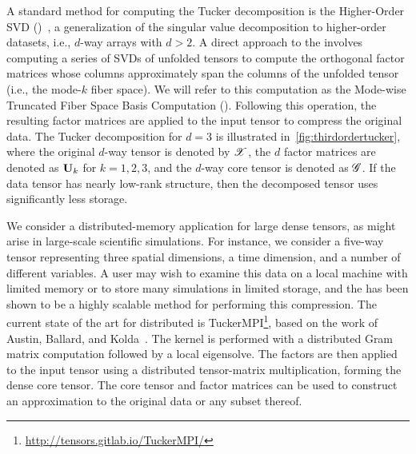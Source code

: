 A standard method for computing the Tucker decomposition is the Higher-Order SVD 
(\hosvd)~\cite{Lathauwer00amultilinear}, a generalization of the singular value 
decomposition to higher-order datasets, i.e., $d$-way arrays with $d>2$.
% 
A direct approach to the \hosvd involves computing a series of SVDs of 
unfolded tensors to compute the orthogonal factor matrices whose 
columns approximately span the columns of the unfolded tensor (i.e., the 
mode-$k$ fiber space). We will refer to this computation as the Mode-wise Truncated Fiber Space Basis Computation (\MTFSBC).
Following this operation, the resulting factor matrices are applied to the input tensor to compress the original data.
%
The Tucker decomposition for $d=3$ is
illustrated in~\cref{fig:thirdordertucker}, where the original $d$-way tensor is 
denoted by $\T{X}$, the $d$ factor matrices are denoted as $\Mn{U}{k}$ for $k=1,2,3$,
and the $d$-way core tensor is denoted as $\T{G}$. 
If the data tensor has nearly low-rank structure, then the decomposed tensor uses significantly
less storage.
%

%
We consider a distributed-memory application for large dense tensors, as might arise in large-scale 
scientific simulations. For instance, we consider a five-way tensor representing three spatial dimensions, 
a time dimension, and a number of different variables. A user may wish to examine this data on a local 
machine with limited memory or to store many simulations in limited storage, and the \hosvd has been 
shown to be a highly scalable method for performing this compression.
The current state of the art for distributed \hosvd is TuckerMPI\footnote{\url{http://tensors.gitlab.io/TuckerMPI/}}, 
based on the work of Austin, Ballard, and Kolda~\cite{AuBaKo16}. The \MTFSBC kernel is performed with a distributed Gram matrix computation followed by a local eigensolve. The factors are then applied to the input tensor using a distributed tensor-matrix multiplication, forming the dense core tensor. The core tensor and factor matrices can be used to construct an approximation to the original data or any subset thereof.

